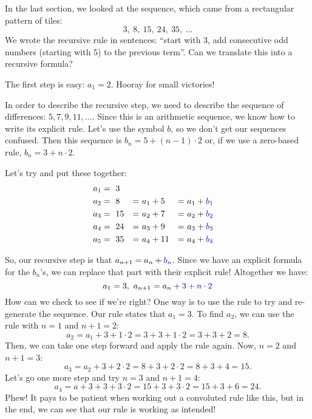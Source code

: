 In the last section, we looked at the sequence, which came from a rectangular pattern of tiles: \[3,~ 8,~ 15,~ 24,~ 35,~\dotsc\]
We wrote the recursive rule in sentences: ``start with 3, add consecutive odd numbers (starting with 5) to the previous term''. Can we translate this into a recursive formula?

The first step is easy: $a_1 = 2$. Hooray for small victories!

In order to describe the recursive step, we need to describe the sequence of differences: $5, 7, 9, 11, \dotsc$. Since this is an arithmetic sequence, we know how to write its explicit rule. Let's use the symbol $b$, so we don't get our sequences confused. Then this sequence is {\color{blue!90!black}$b_n = 5 + (n-1)\cdot 2$} or, if we use a zero-based rule, {\color{blue!90!black}$b_n = 3 + n\cdot 2$}.

Let's try and put these together:
\[\begin{aligned}
a_1 &=~3\\
a_2 &=~8	&=~& a_1 + 5		&=~& a_1 + {\color{blue!90!black}b_1}\\
a_3 &=~15	&=~& a_2 + 7		&=~& a_2 + {\color{blue!90!black}b_2}\\
a_4 &=~24	&=~& a_3 + 9		&=~& a_3 + {\color{blue!90!black}b_3}\\
a_5 &=~35	&=~& a_4 + 11		&=~& a_4 + {\color{blue!90!black}b_4}
\end{aligned}\]

So, our recursive step is that $a_{n+1} = a_n + {\color{blue!90!black}b_n}$. Since we have an explicit formula for the $b_n$'s, we can replace that part with their explicit rule! Altogether we have: \[a_1 = 3, ~ a_{n+1} = a_n + {\color{blue!90!black}3 + n\cdot 2}\]
How can we check to see if we're right? One way is to use the rule to try and re-generate the sequence. Our rule states that $a_1 = 3$. To find $a_2$, we can use the rule with $n=1$ and $n+1 = 2$:
\[a_2 = a_1 + 3 + 1 \cdot 2 = 3 + 3 + 1 \cdot 2 = 3 + 3 + 2 = 8.\]
Then, we can take one step forward and apply the rule again. Now, $n=2$ and $n+1 = 3$:
\[a_3 = a_2 + 3 + 2 \cdot 2 = 8 + 3 + 2 \cdot 2 = 8 + 3 + 4 = 15.\]
Let's go one more step and try $n=3$ and $n+1=4$:
\[a_4 = a+3 + 3 + 3 \cdot 2 = 15 + 3 + 3 \cdot 2 = 15 + 3 + 6 = 24.\]
Phew! It pays to be patient when working out a convoluted rule like this, but in the end, we can see that our rule is working as intended!


